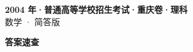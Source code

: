 \documentclass[zihao=-4, a4paper]{ctexart}
\begin{document}
\begin{center}
  {\Large\bfseries 2004 年·普通高等学校招生考试·重庆卷·理科}\\[4pt]
  {\large 数学 · 简答版}
\end{center}
\medskip
{}

\clearpage
{}
\begin{center}{\Large\bfseries 答案速查}\end{center}
\medskip

\end{document}
